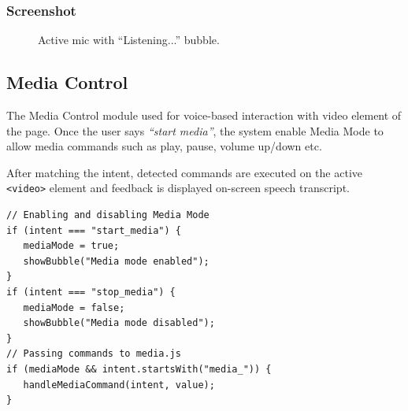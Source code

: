 \subsubsection*{Screenshot}
\begin{figure}[htbp] 
    \centering
    \caption{ Active mic with “Listening...” bubble.}
    \label{fig:active_mic}
\end{figure}


\subsection{Media Control}

The Media Control module used for voice-based interaction with video element of the page. 
Once the user says \textit{``start media''}, the system enable Media Mode to allow media commands such as play, pause, volume up/down etc. 

After matching the intent, detected commands are executed on the active \texttt{<video>} element and feedback is displayed on-screen speech transcript.

\begin{verbatim}
// Enabling and disabling Media Mode
if (intent === "start_media") {
   mediaMode = true;
   showBubble("Media mode enabled");
}
if (intent === "stop_media") {
   mediaMode = false;
   showBubble("Media mode disabled");
}
// Passing commands to media.js
if (mediaMode && intent.startsWith("media_")) {
   handleMediaCommand(intent, value);
}
\end{verbatim}

